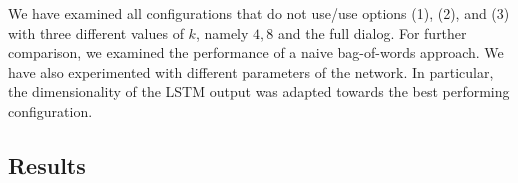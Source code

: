 We have examined all configurations that do not use/use options 
(1), (2), and (3) with three different values of $k$, namely $4,8$ and 
the full dialog. For further comparison, we examined the performance of a naive bag-of-words 
approach. 
We have also experimented with different parameters of the network. 
In particular, the dimensionality of the LSTM output was adapted towards 
the best performing configuration.




\subsection{Results}


